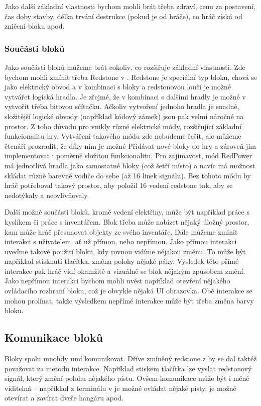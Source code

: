 Jako další základní vlastnosti bychom mohli brát třeba zdraví, cenu za postavení, čas doby stavby, délka trvání destrukce (pokud je od hráče), co hráč získá od zničení bloku apod.

\subsubsection{Součásti bloků}
Jako součásti bloků můžeme brát cokoliv, co rozšiřuje základní vlastnosti. Zde bychom mohli zmínit třeba Redstone v . Redstone je speciální typ bloku, chová se jako elektrický obvod a v kombinaci s bloky a redstonovou loučí je možné vytvářet logická hradla. Je zřejmé, že v kombinaci s dalšími hradly je možné v  vytvořit třeba bitovou sčítačku. Ačkoliv vytvoření jednoho hradla je snadné, složitější logické obvody (například kódový zámek) jsou pak velmi náročné na prostor. Z toho důvodu pro \MC{} vnikly různé elektrické módy, rozšiřující základní funkcionalitu hry. Vytváření takového módu zde nebudeme řešit, ale můžeme čtenáři prozradit, že díky nim je možné Přidávat nové bloky do hry a zároveň jim implementovat i poměrně složitou funkcionalitu. Pro zajímavost, mód RedPower má jednotlivá hradla jako samostatné bloky (což šetří místo) a navíc má možnost skládat různě barevné vodiče do sebe (až 16 linek signálu). Bez tohoto módu by hráč potřeboval takový prostor, aby položil 16 vedení redstone tak, aby se nedotýkaly a neovlivňovaly.  

Další možné součásti bloků, kromě vedení elektřiny, může být například práce s kyslíkem či práce s inventářem. Blok třeba může nabízet nějaký úložný prostor, kam může hráč přesunovat objekty ze svého inventáře. Dále můžeme zmínit interakci s uživatelem, ať už přímou, nebo nepřímou. Jako přímou interakci uveďme takové použití bloku, kdy rovnou vidíme nějakou změnu. To může být například stisknutí tlačítka, změna polohy nějaké páky. Výsledek této přímé interakce pak hráč vidí okamžitě a vizuálně se blok nějakým způsobem změní. Jako nepřímou interakci bychom mohli uvést například otevření nějakého ovládacího rozhraní bloku, což je obvykle nějaká UI obrazovka. Obě interakce se mohou prolínat, takže výsledkem nepřímé interakce může být třeba změna barvy bloku.

\subsection{Komunikace bloků}
Bloky spolu mnohdy umí komunikovat. Dříve zmíněný redstone z  by se dal taktéž považovat za metodu interakce. Například stiskem tlačítka lze vyslat redstonový signál, který změní polohu nějakého pístu. Ovšem komunikace může být i méně viditelná -- například z terminálu v \SE{} je možné ovládat nějaké písty, je možné otevírat a zavírat dveře hangáru apod.


